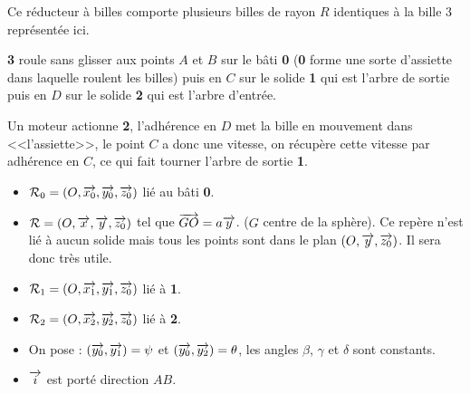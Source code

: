 \documentclass[10pt,oneside]{article}
\begin{document}
\noindent\begin{minipage}[c]{.47\linewidth}

Ce réducteur à billes comporte plusieurs billes de rayon $R$ identiques à la bille 3 représentée ici.

\textbf{3} roule sans glisser aux points $A$ et $B$ sur le bâti \textbf{0} (\textbf{0} forme une sorte d'assiette dans laquelle roulent les billes) puis en $C$ sur le solide \textbf{1} qui est l'arbre de sortie puis en $D$ sur le solide \textbf{2} qui est l'arbre d'entrée.

Un moteur actionne \textbf{2}, l'adhérence en $D$ met la bille en mouvement dans <<l'assiette>>, le point $C$ a donc une vitesse, on récupère cette vitesse par adhérence en $C$, ce qui fait tourner l'arbre de sortie \textbf{1}.

\begin{itemize}
\item $\mathcal{R}_0 = \left(O,\overrightarrow{x_0},\overrightarrow{y_0},\overrightarrow{z_0}\right)$ lié au bâti \textbf{0}.
\item $\mathcal{R} = \left(O,\overrightarrow{x},\overrightarrow{y},\overrightarrow{z_0}\right)$ tel que $\overrightarrow{GO}=a\overrightarrow{y}$. ($G$ centre de la sphère). Ce repère n'est lié à aucun solide mais tous les points sont dans le plan $\left(O,\overrightarrow{y},\overrightarrow{z_0} \right)$. Il sera donc très utile.
\item $\mathcal{R}_1 = \left(O,\overrightarrow{x_1},\overrightarrow{y_1},\overrightarrow{z_0}\right)$ lié à \textbf{1}.
\item $\mathcal{R}_2 = \left(O,\overrightarrow{x_2},\overrightarrow{y_2},\overrightarrow{z_0}\right)$ lié à \textbf{2}.
\item On pose : $\left( \overrightarrow{y_0},\overrightarrow{y_1}\right)=\psi$ et $\left( \overrightarrow{y_0},\overrightarrow{y_2}\right)=\theta$, les angles $\beta$, $\gamma$ et $\delta$ sont constants. 
\item $\overrightarrow{i}$ est porté direction $AB$.
\end{itemize}

\end{minipage}\hfill
\end{document}
